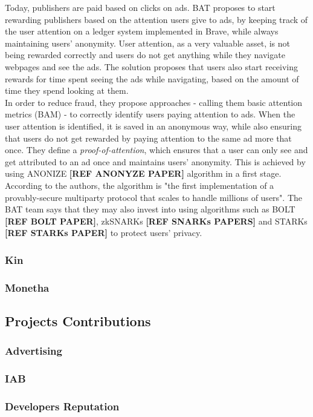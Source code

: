 Today, publishers are paid based on clicks on ads. BAT proposes to start rewarding publishers based on the attention users give to ads, by keeping track of the user attention on a ledger system implemented in Brave, while always maintaining users' anonymity. User attention, as a very valuable asset, is not being rewarded correctly and users do not get anything while they navigate webpages and see the ads. The solution proposes that users also start receiving rewards for time spent seeing the ads while navigating, based on the amount of time they spend looking at them. \\

In order to reduce fraud, they propose approaches - calling them basic attention metrics (BAM) - to correctly identify users paying attention to ads. When the user attention is identified, it is saved in an anonymous way, while also ensuring that users do not get rewarded by paying attention to the same ad more that once. They define a \textit{proof-of-attention}, which ensures that a user can only see and get attributed to an ad once and maintains users' anonymity. This is achieved by using \textsf{ANONIZE} \textbf{[REF ANONYZE PAPER]} algorithm in a first stage. According to the authors, the algorithm is "the first implementation of a provably-secure multiparty protocol that scales to handle millions of users".  The BAT team says that they may also invest into using algorithms such as BOLT \textbf{[REF BOLT PAPER]}, zkSNARKs \textbf{[REF SNARKs PAPERS]} and STARKs \textbf{[REF STARKs PAPER]} to protect users' privacy.

\subsubsection{Kin}



\subsubsection{Monetha}


\subsection{Projects Contributions}
\subsubsection{Advertising}

\subsubsection{IAB}

\subsubsection{Developers Reputation}






